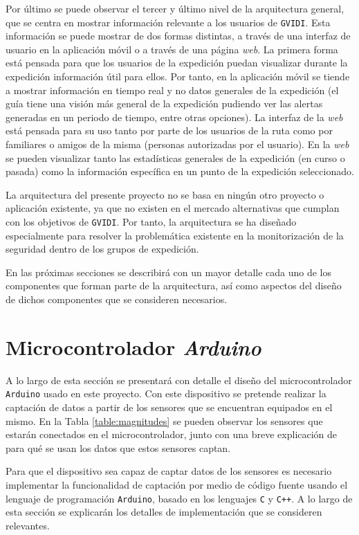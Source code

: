 Por último se puede observar el tercer y último nivel de la arquitectura general, que se centra en mostrar información relevante a los usuarios de \texttt{GVIDI}. Esta información se puede mostrar de dos formas distintas, a través de una interfaz de usuario en la aplicación móvil o a través de una página \textit{web}. La primera forma está pensada para que los usuarios de la expedición puedan visualizar durante la expedición información útil para ellos. Por tanto, en la aplicación móvil se tiende a mostrar información en tiempo real y no datos generales de la expedición (el guía tiene una visión más general de la expedición pudiendo ver las alertas generadas en un periodo de tiempo, entre otras opciones). La interfaz de la \textit{web} está pensada para su uso tanto por parte de los usuarios de la ruta como por familiares o amigos de la misma (personas autorizadas por el usuario). En la \textit{web} se pueden visualizar tanto las estadísticas generales de la expedición (en curso o pasada) como la información específica en un punto de la expedición seleccionado.

La arquitectura del presente proyecto no se basa en ningún otro proyecto o aplicación existente, ya que no existen en el mercado alternativas que cumplan con los objetivos de \texttt{GVIDI}. Por tanto, la arquitectura se ha diseñado especialmente para resolver la problemática existente en la monitorización de la seguridad dentro de los grupos de expedición.

En las próximas secciones se describirá con un mayor detalle cada uno de los componentes que forman parte de la arquitectura, así como aspectos del diseño de dichos componentes que se consideren necesarios.

\section{Microcontrolador \textit{Arduino}}

A lo largo de esta sección se presentará con detalle el diseño del microcontrolador \texttt{Arduino} usado en este proyecto. Con este dispositivo se pretende realizar la captación de datos a partir de los sensores que se encuentran equipados en el mismo. En la Tabla \ref{table:magnitudes} se pueden observar los sensores que estarán conectados en el microcontrolador, junto con una breve explicación de para qué se usan los datos que estos sensores captan. 

Para que el dispositivo sea capaz de captar datos de los sensores es necesario implementar la funcionalidad de captación por medio de código fuente usando el lenguaje de programación \texttt{Arduino}, basado en los lenguajes \texttt{C} y \texttt{C++}. A lo largo de esta sección se explicarán los detalles de implementación que se consideren relevantes. 

